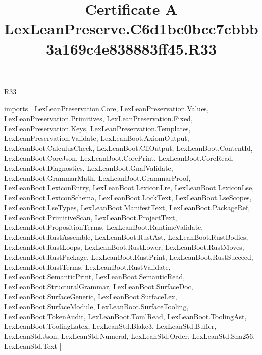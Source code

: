 \begin{lexlean}{R33}
\title{Certificate A LexLeanPreserve.C6d1bc0bcc7cbbb3a169c4e838883ff45.R33}
\begin{coremodule}
imports [
  LexLeanPreservation.Core,
  LexLeanPreservation.Values,
  LexLeanPreservation.Primitives,
  LexLeanPreservation.Fixed,
  LexLeanPreservation.Keys,
  LexLeanPreservation.Templates,
  LexLeanPreservation.Validate,
  LexLeanBoot.AxiomOutput,
  LexLeanBoot.CalculusCheck,
  LexLeanBoot.CliOutput,
  LexLeanBoot.ContentId,
  LexLeanBoot.CoreJson,
  LexLeanBoot.CorePrint,
  LexLeanBoot.CoreRead,
  LexLeanBoot.Diagnostics,
  LexLeanBoot.GnafValidate,
  LexLeanBoot.GrammarMath,
  LexLeanBoot.GrammarProof,
  LexLeanBoot.LexiconEntry,
  LexLeanBoot.LexiconLre,
  LexLeanBoot.LexiconLse,
  LexLeanBoot.LexiconSchema,
  LexLeanBoot.LockText,
  LexLeanBoot.LseScopes,
  LexLeanBoot.LseTypes,
  LexLeanBoot.ManifestText,
  LexLeanBoot.PackageRef,
  LexLeanBoot.PrimitiveScan,
  LexLeanBoot.ProjectText,
  LexLeanBoot.PropositionTerms,
  LexLeanBoot.RuntimeValidate,
  LexLeanBoot.RustAssemble,
  LexLeanBoot.RustAst,
  LexLeanBoot.RustBodies,
  LexLeanBoot.RustLoops,
  LexLeanBoot.RustLower,
  LexLeanBoot.RustMoves,
  LexLeanBoot.RustPackage,
  LexLeanBoot.RustPrint,
  LexLeanBoot.RustSucceed,
  LexLeanBoot.RustTerms,
  LexLeanBoot.RustValidate,
  LexLeanBoot.SemanticPrint,
  LexLeanBoot.SemanticRead,
  LexLeanBoot.StructuralGrammar,
  LexLeanBoot.SurfaceDoc,
  LexLeanBoot.SurfaceGeneric,
  LexLeanBoot.SurfaceLex,
  LexLeanBoot.SurfaceModule,
  LexLeanBoot.SurfaceTooling,
  LexLeanBoot.TokenAudit,
  LexLeanBoot.TomlRead,
  LexLeanBoot.ToolingAst,
  LexLeanBoot.ToolingLatex,
  LexLeanStd.Blake3,
  LexLeanStd.Buffer,
  LexLeanStd.Json,
  LexLeanStd.Numeral,
  LexLeanStd.Order,
  LexLeanStd.Sha256,
  LexLeanStd.Text
]


\end{coremodule}
\end{lexlean}
